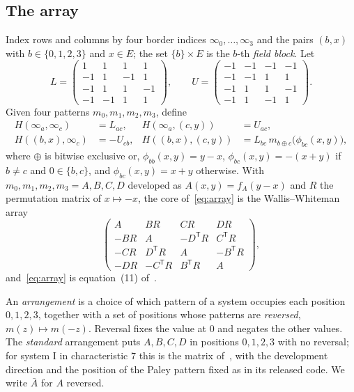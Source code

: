 \documentclass[11pt]{article}
\theoremstyle{plain}
\theoremstyle{definition}
\theoremstyle{remark}
\begin{document}
\subsection{The array}
Index rows and columns by four border indices $\infty_0,\dots,\infty_3$ and
the pairs $(b,x)$ with $b\in\{0,1,2,3\}$ and $x\in E$; the set
$\{b\}\times E$ is the $b$-th \emph{field block}. Let
\[
L=\begin{pmatrix}1&1&1&1\\-1&1&-1&1\\-1&1&1&-1\\-1&-1&1&1\end{pmatrix},\qquad
U=\begin{pmatrix}-1&-1&-1&-1\\-1&-1&1&1\\-1&1&1&-1\\-1&1&-1&1\end{pmatrix}.
\]
Given four patterns $m_0,m_1,m_2,m_3$, define
\begin{equation}\label{eq:array}
\begin{aligned}
H(\infty_a,\infty_c)&=L_{ac}, & H(\infty_a,(c,y))&=U_{ac},\\
H((b,x),\infty_c)&=-U_{cb}, & H((b,x),(c,y))&=L_{bc}\,m_{b\oplus c}\bigl(\phi_{bc}(x,y)\bigr),
\end{aligned}
\end{equation}
where $\oplus$ is bitwise exclusive or, $\phi_{bb}(x,y)=y-x$,
$\phi_{bc}(x,y)=-(x+y)$ if $b\ne c$ and $0\in\{b,c\}$, and
$\phi_{bc}(x,y)=x+y$ otherwise. With $m_0,m_1,m_2,m_3=A,B,C,D$ developed as
$A(x,y)=f_A(y-x)$ and $R$ the permutation matrix of $x\mapsto-x$, the core
of~\eqref{eq:array} is the Wallis--Whiteman array
\[
\begin{pmatrix}
A&BR&CR&DR\\
-BR&A&-D^{\mathsf T}R&C^{\mathsf T}R\\
-CR&D^{\mathsf T}R&A&-B^{\mathsf T}R\\
-DR&-C^{\mathsf T}R&B^{\mathsf T}R&A
\end{pmatrix},
\]
and~\eqref{eq:array} is equation~(11) of~\cite{Kline18}.

An \emph{arrangement} is a choice of which pattern of a system occupies each
position $0,1,2,3$, together with a set of positions whose patterns are
\emph{reversed}, $m(z)\mapsto m(-z)$. Reversal fixes the value at $0$ and
negates the other values. The \emph{standard} arrangement puts $A,B,C,D$ in
positions $0,1,2,3$ with no reversal; for system I in characteristic $7$
this is the matrix of~\cite{Kline18}, with the development direction and the
position of the Paley pattern fixed as in its released code. We write $\bar A$ for $A$ reversed.
\end{document}

